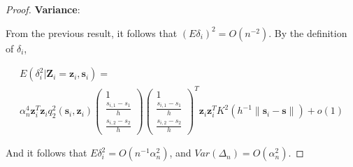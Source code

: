 \documentclass[authoryear,review, 12pt]{elsarticle}
\begin{document}
\begin{proof}
\textbf{Variance}:

From the previous result, it follows that $\left(E\delta_{i}\right)^{2}=O\left(n^{-2}\right)$.
By the definition of $\delta_{i}$,

\begin{multline*}
E\left(\delta_{i}^{2}|\bm{Z}_{i}=\bm{z}_{i},\bm{s}_{i}\right)=\\
\alpha_{n}^{4}\bm{z}_{i}^{T}\bm{z}_{i}q_{2}^{2}\left(\bm{s}_{i},\bm{z}_{i}\right)\left(\begin{array}{c}
1\\
\frac{s_{i,1}-s_{1}}{h}\\
\frac{s_{i,2}-s_{2}}{h}
\end{array}\right)\left(\begin{array}{c}
1\\
\frac{s_{i,1}-s_{1}}{h}\\
\frac{s_{i,2}-s_{2}}{h}
\end{array}\right)^{T}\bm{z}_{i}\bm{z}_{i}^{T}K^{2}\left(h^{-1}\|\bm{s}_{i}-\bm{s}\|\right)+o\left(1\right)
\end{multline*}


And it follows that $E\delta_{i}^{2}=O\left(n^{-1}\alpha_{n}^{2}\right)$,
and $Var\left(\Delta_{n}\right)=O\left(\alpha_{n}^{2}\right)$.
\end{proof}



\end{document}
